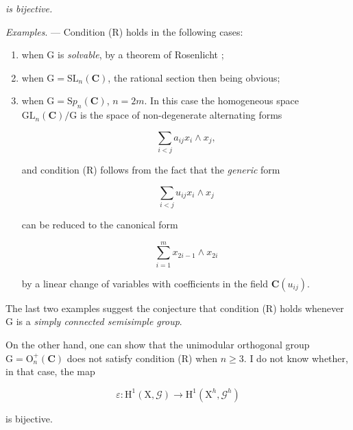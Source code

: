 \emph{is bijective.}

\emph{Examples}. --- Condition (R) holds in the following cases:

\begin{enumerate}[label=\emph{\alph*)},leftmargin=2.2em]
\item when $\mathrm{G}$ is \emph{solvable}, by a theorem of Rosenlicht ;

\item when $\mathrm{G}=\mathrm{SL}_n(\mathbf{C})$, the rational section then being
obvious;

\item when $\mathrm{G}=\mathrm{S}p_n(\mathbf{C})$, $n=2m$. In this case the homogeneous
space $\mathrm{GL}_n(\mathbf{C})/\mathrm{G}$ is the space of non-degenerate alternating
forms

\begin{equation*}
\sum_{i<j}a_{ij}x_i\wedge x_j,
\end{equation*}

and condition (R) follows from the fact that the \emph{generic} form

\begin{equation*}
\sum_{i<j}u_{ij}x_i\wedge x_j
\end{equation*}

can be reduced to the canonical form

\begin{equation*}
\sum_{i=1}^{m}x_{2i-1}\wedge x_{2i}
\end{equation*}

by a linear change of variables with coefficients in the field
$\mathbf{C}(u_{ij})$.
\end{enumerate}

The last two examples suggest the conjecture that condition (R) holds whenever
$\mathrm{G}$ is a \emph{simply connected semisimple group}.

On the other hand, one can show that the unimodular orthogonal group
$\mathrm{G}=\mathrm{O}_n^+(\mathbf{C})$ does not satisfy condition (R) when $n\geqslant3$.
I do not know whether, in that case, the map

\begin{equation*}
\varepsilon:\mathrm{H}^1(\mathrm{X},\mathcal{G})
\longrightarrow\mathrm{H}^1(\mathrm{X}^h,\mathcal{G}^h)
\end{equation*}

is bijective.
